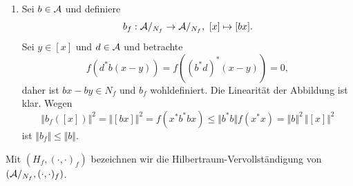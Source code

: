 \begin{remark}
\begin{enumerate}
        Betrachte nun den ``Kern''
        $$ N_f \coloneqq \{ c \in \Aa : f(c^* c) = 0 \} \subseteq \Aa. $$
        Setze
        $$ M_f \coloneqq \{ c \in \Aa : f(d^* c) = 0, \ \forall d \in \Aa \} \subseteq \Aa, $$
        so gilt klarerweise $N_f \supseteq M_f$. Nach Cauchy-Schwarz gilt
        $$ \vert f(d^* c) \vert^2 \leq f(d^* d) f(c^* c) = 0, $$
        und damit auch die andere Inklusion und es gilt $N_f = M_f$. Inbesondere ist $N_f$ der Orthogonalraum (insbesondere ein Unterraum) von $\Aa$ bezüglich der definierten Sesquilinearform.

        Damit können wir auf $\Aa /_{N_f}$ eine Abbildung definieren durch
        $$ ([x], [y])_f \coloneqq f(y^* x). $$
        Seien $u \in [x], v \in [y]$, so ist
        \begin{align*}
            f(v^* u) &= f((y + (v-y))^* (x + (u - x))) = \\
            &= f(y^* x) + f((v-y)^* x) + f((y^* (u- x)) + f((v - y)^* (u - x))) \\
            &= f(y^* x),
        \end{align*}
        unter Verwendung des oben Gezeigten. Insbesondere ist die Abbildung wohldefiniert und man prüft sofort nach, dass sie auch eine hermitesche Sesquilinearform definiert. Für $c \in \Aa$ gilt
        $$ 0 = ([c], [c])_f = f(c^* c), $$
        also $c \in N_f$ und die Abbildung ist sogar positiv definit.

        \item Sei $b \in \mathcal{A}$ und definiere
        $$ b_f : \mathcal{A}/_{N_f} \to \mathcal{A}/_{N_f}, \ [x] \mapsto [bx]. $$
        Sei $y \in [x]$ und $d \in \mathcal{A}$ und betrachte
        $$ f(d^* b(x-y)) = f((b^* d)^* (x-y)) = 0, $$
        daher ist $bx - by \in N_f$ und $b_f$ wohldefiniert. Die Linearität der Abbildung ist klar. Wegen
        $$ \Vert b_f([x]) \Vert^2 = \Vert [bx] \Vert^2 = f(x^* b^* b x) \leq \Vert b^* b \Vert f(x^* x) = \Vert b \Vert^2 \, \Vert [x] \Vert^2 $$
        ist $ \Vert b_f \Vert \leq \Vert b \Vert $.
    \end{enumerate}
\end{remark}

\begin{definition}
    Mit $(H_f, (\cdot, \cdot)_f)$ bezeichnen wir die Hilbertraum-Vervollständigung von $(\mathcal{A}/_{N_f}, (\cdot, \cdot)_f)$.
\end{definition}

